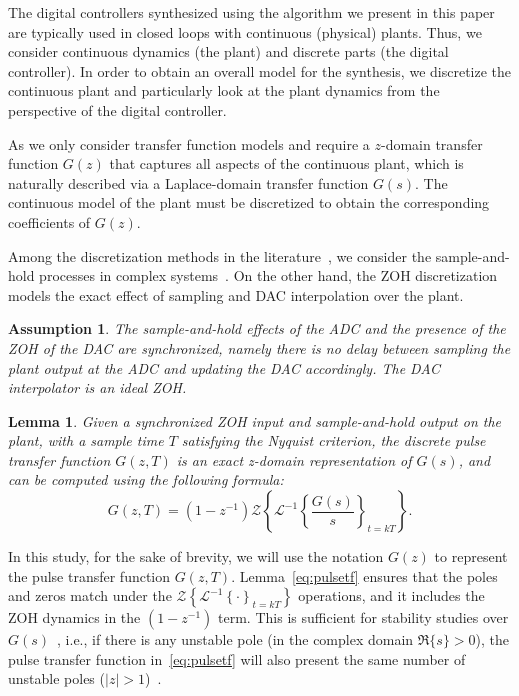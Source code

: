 \documentclass[final]{sig-alternate-05-2015}
\newtheorem{myassumption}{Assumption}
\newtheorem{mylemma}{Lemma}
\begin{document}
The digital controllers synthesized using the algorithm we present in this
paper are typically used in closed loops with continuous (physical) plants. 
Thus, we consider continuous dynamics (the plant) and discrete parts (the
digital controller). In order to obtain an overall model for the synthesis, 
we discretize the continuous plant and particularly look at the plant dynamics 
from the perspective of the digital controller. 

As we only consider transfer function models and require a $z$-domain transfer
function $G(z)$ that captures all aspects of the continuous plant, 
which is naturally described via a Laplace-domain transfer function $G(s)$. 
The continuous model of the plant must be discretized to obtain the
corresponding coefficients of $G(z)$.

Among the discretization methods in the literature~\cite{Franklin15}, we
consider the sample-and-hold processes in complex
systems~\cite{istepanian2012digital}.  On the other hand, the ZOH
discretization models the exact effect of sampling and DAC interpolation
over the plant.

\begin{myassumption}
%
The sample-and-hold effects of the ADC and the presence of the ZOH of the DAC are synchronized,
namely there is no delay between sampling the plant output at the ADC and
updating the DAC accordingly.  The DAC interpolator is an ideal ZOH. 
%
\end{myassumption}

\begin{mylemma}\cite{astrom1997computer}
%
Given a synchronized ZOH input and sample-and-hold output on the plant, 
with a sample time $T$ satisfying the Nyquist criterion, the discrete pulse
transfer function $G(z,T)$ is an exact z-domain representation of $G(s)$, 
and can be computed using the following formula:
%
\begin{equation}
\label{eq:pulsetf}
G(z,T) = %
(1-z^{-1})\mathcal{Z}\left\lbrace{\mathcal{L}^{-1}\left\lbrace{\frac{G(s)}{s}}\right\rbrace_{t=kT}}\right\rbrace.
\end{equation}
%
\end{mylemma}
%
In this study, for the sake of brevity, we will use the notation $G(z)$ to represent the
pulse transfer function $G(z,T)$.
% 
Lemma~\ref{eq:pulsetf} ensures that the poles and zeros match under the
$\mathcal{Z}\left\lbrace{\mathcal{L}^{-1}\left\lbrace{\cdot}\right\rbrace_{t=kT}}\right\rbrace$
operations, and it includes the ZOH dynamics in the $(1-z^{-1})$ term.  This
is sufficient for stability studies over $G(s)$~\cite{fadali}, i.e., if
there is any unstable pole (in the complex domain $\Re\{s\} > 0$), the pulse
transfer function in~\eqref{eq:pulsetf} will also present the same number of
unstable poles ($|z| > 1$)~\cite{Franklin15}.
\end{document}
